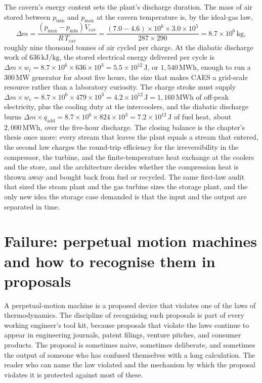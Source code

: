 The cavern's energy content sets the plant's discharge duration. The mass
of air stored between $p_{\min}$ and $p_{\max}$ at the cavern temperature
is, by the ideal-gas law,
\[
\Delta m = \frac{(p_{\max} - p_{\min}) V_{\text{cav}}}{R\,T_{\text{cav}}}
  = \frac{(7.0 - 4.6)\times 10^6 \times 3.0\times 10^5}
         {287 \times 290}
  = 8.7 \times 10^6\,\text{kg},
\]
roughly nine thousand tonnes of air cycled per charge. At the diabatic
discharge work of $636\,\text{kJ}/\text{kg}$, the stored electrical
energy delivered per cycle is $\Delta m \times w_t = 8.7\times 10^6
\times 636 \times 10^3 = 5.5\times 10^{12}\,\text{J}$, or
$1{,}540\,\text{MWh}$, enough to run a $300\,\text{MW}$ generator for
about five hours, the size that makes CAES a grid-scale resource rather
than a laboratory curiosity. The charge stroke must supply
$\Delta m \times w_c = 8.7\times 10^6 \times 479 \times 10^3 =
4.2\times 10^{12}\,\text{J} = 1{,}160\,\text{MWh}$ of off-peak
electricity, plus the cooling duty at the intercoolers, and the diabatic
discharge burns $\Delta m \times q_{\text{add}} = 8.7\times 10^6 \times
824 \times 10^3 = 7.2\times 10^{12}\,\text{J}$ of fuel heat, about
$2{,}000\,\text{MWh}$, over the five-hour discharge. The closing balance
is the chapter's thesis once more: every stream that leaves the plant
equals a stream that entered, the second law charges the round-trip
efficiency for the irreversibility in the compressor, the turbine, and
the finite-temperature heat exchange at the coolers and the store, and
the architecture decides whether the compression heat is thrown away and
bought back from fuel or recycled. The same first-law audit that sized
the steam plant and the gas turbine sizes the storage plant, and the only
new idea the storage case demanded is that the input and the output are
separated in time.

\section{Failure: perpetual motion machines and how to recognise them in proposals}

A perpetual-motion machine is a proposed device that violates one of
the laws of thermodynamics. The discipline of recognising such
proposals is part of every working engineer's tool kit, because
proposals that violate the laws continue to appear in engineering
journals, patent filings, venture pitches, and consumer products. The
proposal is sometimes naive, sometimes deliberate, and sometimes the
output of someone who has confused themselves with a long calculation.
The reader who can name the law violated and the mechanism by which
the proposal violates it is protected against most of these.

